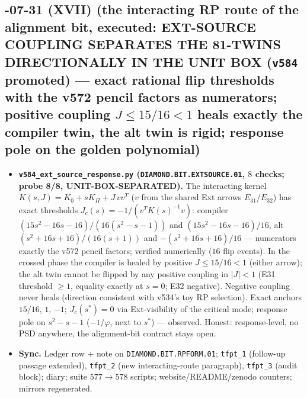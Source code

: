 \documentclass[11pt]{article}
\begin{document}
\subsection*{-07-31 (XVII) (the interacting RP route of the alignment bit, executed: EXT-SOURCE COUPLING SEPARATES THE 81-TWINS DIRECTIONALLY IN THE UNIT BOX (\texttt{v584} promoted) --- exact rational flip thresholds with the v572 pencil factors as numerators; positive coupling $J\le15/16<1$ heals exactly the compiler twin, the alt twin is rigid; response pole on the golden polynomial)}
\begin{itemize}[leftmargin=1.5em]
\item \textbf{\texttt{v584\_ext\_source\_response.py} (\texttt{DIAMOND.BIT.EXTSOURCE.01}, $8$
checks; probe 8/8, UNIT-BOX-SEPARATED).} The interacting kernel $K(s,J)=K_0+sK_\Pi+J\,vv^T$
($v$ from the shared Ext arrows $E_{31}/E_{32}$) has exact thresholds
$J_c(s)=-1/(v^TK(s)^{-1}v)$: compiler $(15s^2{-}16s{-}16)/(16(s^2{-}s{-}1))$ and
$(15s^2{-}16s{-}16)/16$, alt $(s^2{+}16s{+}16)/(16(s{+}1))$ and $-(s^2{+}16s{+}16)/16$ ---
numerators exactly the v572 pencil factors; verified numerically ($16$ flip events).  In the
crossed phase the compiler is healed by positive $J\le15/16<1$ (either arrow); the alt twin
cannot be flipped by any positive coupling in $|J|<1$ (E31 threshold $\ge1$, equality exactly
at $s=0$; E32 negative).  Negative coupling never heals (direction consistent with v534's toy
RP selection).  Exact anchors $15/16$, $1$, $-1$; $J_c(s^*)=0$ via Ext-visibility of the
critical mode; response pole on $s^2{-}s{-}1$ ($-1/\varphi$, next to $s^*$) --- observed.
Honest: response-level, no PSD anywhere, the alignment-bit contract stays open.
\item \textbf{Sync.} Ledger row + note on \texttt{DIAMOND.BIT.RPFORM.01};
\texttt{tfpt\_1} (follow-up passage extended), \texttt{tfpt\_2} (new interacting-route
paragraph), \texttt{tfpt\_3} (audit block); diary; suite $577\to578$ scripts;
website/README/zenodo counters; mirrors regenerated.
\end{itemize}
\end{document}
